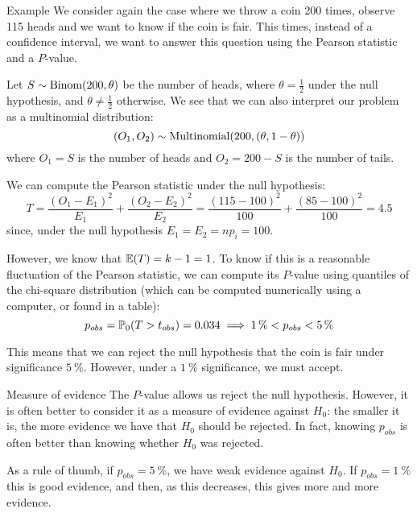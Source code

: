 \documentclass[a4paper]{article}
\begin{document}
\begin{parag}{Example}
    We consider again the case where we throw a coin 200 times, observe 115 heads and we want to know if the coin is fair. This times, instead of a confidence interval, we want to answer this question using the Pearson statistic and a $P$-value.

    Let $S \followsdistr \text{Binom}\left(200, \theta\right)$ be the number of heads, where $\theta = \frac{1}{2}$ under the null hypothesis, and $\theta \neq \frac{1}{2}$ otherwise. We see that we can also interpret our problem as a multinomial distribution:
    \[\left(O_1, O_2\right) \followsdistr \text{Multinomial}\left(200, \left(\theta, 1 - \theta\right)\right)\]
    where $O_1 = S$ is the number of heads and $O_2 = 200 - S$ is the number of tails.

    We can compute the Pearson statistic under the null hypothesis: 
    \[T = \frac{\left(O_1 - E_1\right)^2}{E_1} + \frac{\left(O_2 - E_2\right)^2}{E_2} = \frac{\left(115 - 100\right)^2}{100} + \frac{\left(85 - 100\right)^2}{100} = 4.5\]
    since, under the null hypothesis $E_1 = E_2 = n p_i = 100$.

    However, we know that $\exval\left(T\right) = k-1 = 1$. To know if this is a reasonable fluctuation of the Pearson statistic, we can compute its $P$-value using quantiles of the chi-square distribution (which can be computed numerically using a computer, or found in a table): 
    \[p_{obs} = \prob_0\left(T > t_{obs}\right) = 0.034 \implies \SI{1}{\percent} < p_{obs} < \SI{5}{\percent}\]
    
    This means that we can reject the null hypothesis that the coin is fair under significance $\SI{5}{\percent}$. However, under a $\SI{1}{\percent}$ significance, we must accept.
\end{parag}

\begin{parag}{Measure of evidence}
    The $P$-value allows us reject the null hypothesis. However, it is often better to consider it as a measure of evidence against $H_0$: the smaller it is, the more evidence we have that $H_0$ should be rejected. In fact, knowing $p_{obs}$ is often better than knowing whether $H_0$ was rejected.

    As a rule of thumb, if $p_{obs} = \SI{5}{\percent}$, we have weak evidence against $H_0$. If $p_{obs} = \SI{1}{\percent}$ this is good evidence, and then, as this decreases, this gives more and more evidence.
\end{parag}
\end{document}
